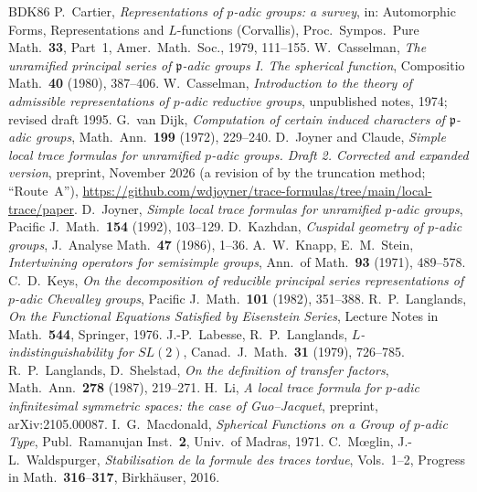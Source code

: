 \documentclass[12pt,letterpaper]{article}
\numberwithin{equation}{section}
\theoremstyle{plain}
\theoremstyle{definition}
\theoremstyle{remark}
\begin{document}
\begin{thebibliography}{BDK86}
 P.~Cartier, \emph{Representations of $p$-adic groups: a survey}, in: Automorphic Forms, Representations and $L$-functions (Corvallis), Proc.\ Sympos.\ Pure Math.\ \textbf{33}, Part~1, Amer.\ Math.\ Soc., 1979, 111--155.
 W.~Casselman, \emph{The unramified principal series of $\mathfrak p$-adic groups I. The spherical function}, Compositio Math.\ \textbf{40} (1980), 387--406.
 W.~Casselman, \emph{Introduction to the theory of admissible representations of $p$-adic reductive groups}, unpublished notes, 1974; revised draft 1995.
 G.~van Dijk, \emph{Computation of certain induced characters of $\mathfrak p$-adic groups}, Math.\ Ann.\ \textbf{199} (1972), 229--240.
 D.~Joyner and Claude, \emph{Simple local trace formulas for unramified $p$-adic groups. Draft 2. Corrected and expanded version}, preprint, November 2026 (a revision of \cite{Jo92} by the truncation method; ``Route~A''), \url{https://github.com/wdjoyner/trace-formulas/tree/main/local-trace/paper}.
 D.~Joyner, \emph{Simple local trace formulas for unramified $p$-adic groups}, Pacific J.\ Math.\ \textbf{154} (1992), 103--129.
 D.~Kazhdan, \emph{Cuspidal geometry of $p$-adic groups}, J.\ Analyse Math.\ \textbf{47} (1986), 1--36.
 A.~W.~Knapp, E.~M.~Stein, \emph{Intertwining operators for semisimple groups}, Ann.\ of Math.\ \textbf{93} (1971), 489--578.
 C.~D.~Keys, \emph{On the decomposition of reducible principal series representations of $p$-adic Chevalley groups}, Pacific J.\ Math.\ \textbf{101} (1982), 351--388.
 R.~P.~Langlands, \emph{On the Functional Equations Satisfied by Eisenstein Series}, Lecture Notes in Math.\ \textbf{544}, Springer, 1976.
 J.-P.~Labesse, R.~P.~Langlands, \emph{$L$-indistinguishability for $SL(2)$}, Canad.\ J.\ Math.\ \textbf{31} (1979), 726--785.
 R.~P.~Langlands, D.~Shelstad, \emph{On the definition of transfer factors}, Math.\ Ann.\ \textbf{278} (1987), 219--271.
 H.~Li, \emph{A local trace formula for $p$-adic infinitesimal symmetric spaces: the case of Guo--Jacquet}, preprint, arXiv:2105.00087.
 I.~G.~Macdonald, \emph{Spherical Functions on a Group of $p$-adic Type}, Publ.\ Ramanujan Inst.\ \textbf{2}, Univ.\ of Madras, 1971.
 C.~M\oe glin, J.-L.~Waldspurger, \emph{Stabilisation de la formule des traces tordue}, Vols.~1--2, Progress in Math.\ \textbf{316}--\textbf{317}, Birkh\"auser, 2016.

\end{thebibliography}
\end{document}
